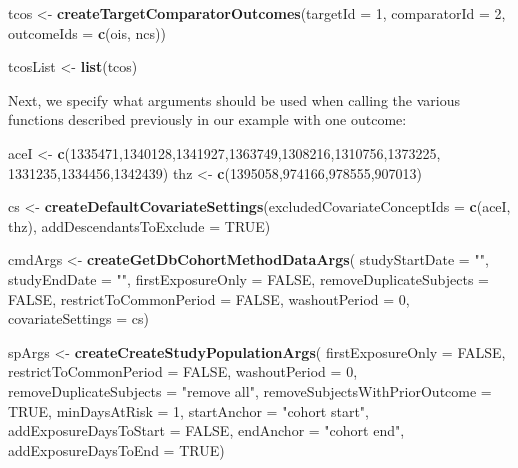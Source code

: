 \documentclass[11pt]{book}
\newenvironment{Shaded}{\begin{snugshade}}{\end{snugshade}}
\newcommand{\DataTypeTok}[1]{\textcolor[rgb]{0.13,0.29,0.53}{#1}}
\newcommand{\DecValTok}[1]{\textcolor[rgb]{0.00,0.00,0.81}{#1}}
\newcommand{\KeywordTok}[1]{\textcolor[rgb]{0.13,0.29,0.53}{\textbf{#1}}}
\newcommand{\NormalTok}[1]{#1}
\newcommand{\OtherTok}[1]{\textcolor[rgb]{0.56,0.35,0.01}{#1}}
\newcommand{\StringTok}[1]{\textcolor[rgb]{0.31,0.60,0.02}{#1}}
\theoremstyle{definition}
\theoremstyle{definition}
\theoremstyle{definition}
\theoremstyle{remark}
\begin{document}
\begin{Shaded}
\begin{Highlighting}[]
\NormalTok{tcos <-}\StringTok{ }\KeywordTok{createTargetComparatorOutcomes}\NormalTok{(}\DataTypeTok{targetId =} \DecValTok{1}\NormalTok{,}
                                       \DataTypeTok{comparatorId =} \DecValTok{2}\NormalTok{,}
                                       \DataTypeTok{outcomeIds =} \KeywordTok{c}\NormalTok{(ois, ncs))}

\NormalTok{tcosList <-}\StringTok{ }\KeywordTok{list}\NormalTok{(tcos)}
\end{Highlighting}
\end{Shaded}

Next, we specify what arguments should be used when calling the various functions described previously in our example with one outcome:

\begin{Shaded}
\begin{Highlighting}[]
\NormalTok{aceI <-}\StringTok{ }\KeywordTok{c}\NormalTok{(}\DecValTok{1335471}\NormalTok{,}\DecValTok{1340128}\NormalTok{,}\DecValTok{1341927}\NormalTok{,}\DecValTok{1363749}\NormalTok{,}\DecValTok{1308216}\NormalTok{,}\DecValTok{1310756}\NormalTok{,}\DecValTok{1373225}\NormalTok{,}
          \DecValTok{1331235}\NormalTok{,}\DecValTok{1334456}\NormalTok{,}\DecValTok{1342439}\NormalTok{)}
\NormalTok{thz <-}\StringTok{ }\KeywordTok{c}\NormalTok{(}\DecValTok{1395058}\NormalTok{,}\DecValTok{974166}\NormalTok{,}\DecValTok{978555}\NormalTok{,}\DecValTok{907013}\NormalTok{)}

\NormalTok{cs <-}\StringTok{ }\KeywordTok{createDefaultCovariateSettings}\NormalTok{(}\DataTypeTok{excludedCovariateConceptIds =} \KeywordTok{c}\NormalTok{(aceI,}
\NormalTok{                                                                     thz),}
                                     \DataTypeTok{addDescendantsToExclude =} \OtherTok{TRUE}\NormalTok{)}

\NormalTok{cmdArgs <-}\StringTok{ }\KeywordTok{createGetDbCohortMethodDataArgs}\NormalTok{(}
  \DataTypeTok{studyStartDate =} \StringTok{""}\NormalTok{,}
  \DataTypeTok{studyEndDate =} \StringTok{""}\NormalTok{,}
  \DataTypeTok{firstExposureOnly =} \OtherTok{FALSE}\NormalTok{,}
  \DataTypeTok{removeDuplicateSubjects =} \OtherTok{FALSE}\NormalTok{,}
  \DataTypeTok{restrictToCommonPeriod =} \OtherTok{FALSE}\NormalTok{,}
  \DataTypeTok{washoutPeriod =} \DecValTok{0}\NormalTok{,}
  \DataTypeTok{covariateSettings =}\NormalTok{ cs)}

\NormalTok{spArgs <-}\StringTok{ }\KeywordTok{createCreateStudyPopulationArgs}\NormalTok{(}
  \DataTypeTok{firstExposureOnly =} \OtherTok{FALSE}\NormalTok{,}
  \DataTypeTok{restrictToCommonPeriod =} \OtherTok{FALSE}\NormalTok{,}
  \DataTypeTok{washoutPeriod =} \DecValTok{0}\NormalTok{,}
  \DataTypeTok{removeDuplicateSubjects =} \StringTok{"remove all"}\NormalTok{,}
  \DataTypeTok{removeSubjectsWithPriorOutcome =} \OtherTok{TRUE}\NormalTok{,}
  \DataTypeTok{minDaysAtRisk =} \DecValTok{1}\NormalTok{,}
  \DataTypeTok{startAnchor =} \StringTok{"cohort start"}\NormalTok{,}
  \DataTypeTok{addExposureDaysToStart =} \OtherTok{FALSE}\NormalTok{,}
  \DataTypeTok{endAnchor =} \StringTok{"cohort end"}\NormalTok{,}
  \DataTypeTok{addExposureDaysToEnd =} \OtherTok{TRUE}\NormalTok{)}


\end{Highlighting}
\end{Shaded}
\end{document}
